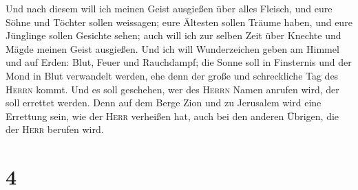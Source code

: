  Und nach diesem will ich meinen Geist ausgießen über
alles Fleisch, und eure Söhne und Töchter sollen weissagen; eure
Ältesten sollen Träume haben, und eure Jünglinge sollen Gesichte sehen;
 auch will ich zur selben Zeit über Knechte und Mägde
meinen Geist ausgießen.  Und ich will Wunderzeichen geben
am Himmel und auf Erden: Blut, Feuer und Rauchdampf;  die
Sonne soll in Finsternis und der Mond in Blut verwandelt werden, ehe
denn der große und schreckliche Tag des \textsc{Herrn} kommt.
 Und es soll geschehen, wer des \textsc{Herrn} Namen
anrufen wird, der soll errettet werden. Denn auf dem Berge Zion und zu
Jerusalem wird eine Errettung sein, wie der \textsc{Herr} verheißen hat,
auch bei den anderen Übrigen, die der \textsc{Herr} berufen wird.

\hypertarget{section-3}{%
\section{4}\label{section-3}}

